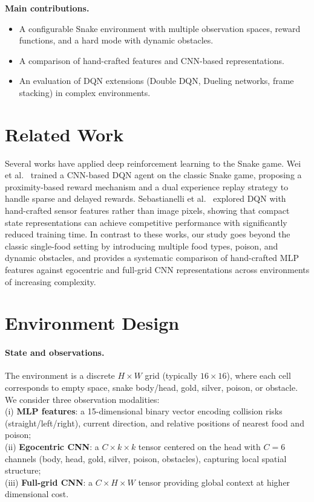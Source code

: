 \documentclass[runningheads]{llncs}
\begin{document}
\noindent\textbf{Main contributions.}
\begin{itemize}
  \item A configurable Snake environment with multiple observation spaces,
        reward functions, and a hard mode with dynamic obstacles.
  \item A comparison of hand-crafted features and CNN-based representations.
  \item An evaluation of DQN extensions (Double DQN, Dueling networks,
        frame stacking) in complex environments.
\end{itemize}

\section{Related Work}
\label{sec:related}

Several works have applied deep reinforcement learning to the Snake game.
Wei et al.~\cite{wei2018autonomous} trained a CNN-based DQN agent on the
classic Snake game, proposing a proximity-based reward mechanism and a
dual experience replay strategy to handle sparse and delayed rewards.
Sebastianelli et al.~\cite{sebastianelli2021deep} explored DQN with
hand-crafted sensor features rather than image pixels, showing that
compact state representations can achieve competitive performance with
significantly reduced training time.
In contrast to these works, our study goes beyond the classic single-food
setting by introducing multiple food types, poison, and dynamic obstacles,
and provides a systematic comparison of hand-crafted MLP features against
egocentric and full-grid CNN representations across environments of
increasing complexity.
 
\section{Environment Design}
\label{sec:env}

\paragraph{State and observations.}
The environment is a discrete $H \times W$ grid (typically $16 \times 16$),
where each cell corresponds to empty space, snake body/head, gold, silver,
poison, or obstacle. We consider three observation modalities:\\
(i) \textbf{MLP features}: a 15-dimensional binary vector encoding collision
risks (straight/left/right), current direction, and relative positions of
nearest food and poison;\\
(ii) \textbf{Egocentric CNN}: a $C \times k \times k$ tensor centered on the
head with $C=6$ channels (body, head, gold, silver, poison, obstacles),
capturing local spatial structure;\\
(iii) \textbf{Full-grid CNN}: a $C \times H \times W$ tensor providing global
context at higher dimensional cost.
\end{document}
